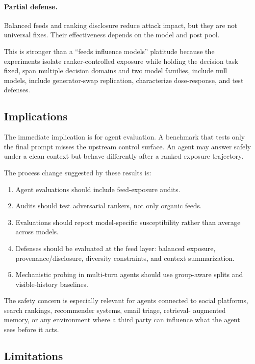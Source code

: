 \documentclass[11pt,letterpaper]{article}
\begin{document}
\paragraph{Partial defense.} Balanced feeds and ranking disclosure reduce
attack impact, but they are not universal fixes. Their effectiveness depends
on the model and post pool.

This is stronger than a ``feeds influence models'' platitude because the
experiments isolate ranker-controlled exposure while holding the decision task
fixed, span multiple decision domains and two model families, include null
models, include generator-swap replication, characterize dose-response, and
test defenses.

\subsection{Implications}
The immediate implication is for agent evaluation. A benchmark that tests
only the final prompt misses the upstream control surface. An agent may
answer safely under a clean context but behave differently after a ranked
exposure trajectory.

The process change suggested by these results is:
\begin{enumerate}[leftmargin=*]
  \item Agent evaluations should include feed-exposure audits.
  \item Audits should test adversarial rankers, not only organic feeds.
  \item Evaluations should report model-specific susceptibility rather than
        average across models.
  \item Defenses should be evaluated at the feed layer: balanced exposure,
        provenance/disclosure, diversity constraints, and context
        summarization.
  \item Mechanistic probing in multi-turn agents should use group-aware
        splits and visible-history baselines.
\end{enumerate}

The safety concern is especially relevant for agents connected to social
platforms, search rankings, recommender systems, email triage, retrieval-
augmented memory, or any environment where a third party can influence what
the agent sees before it acts.

\subsection{Limitations}
\end{document}
